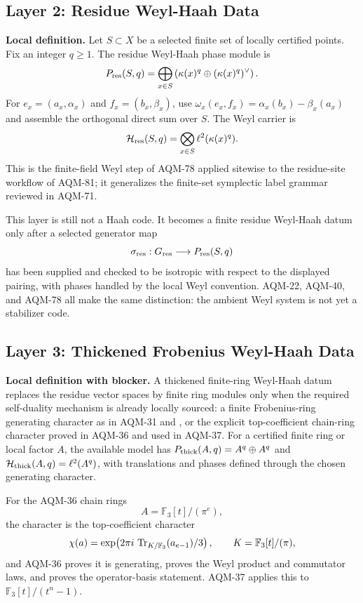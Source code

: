 \subsection{Layer 2: Residue Weyl-Haah Data}

\textbf{Local definition.}  Let \(S\subset X\) be a selected finite set of
locally certified points.  Fix an integer \(q\ge1\).  The residue
Weyl-Haah phase module is
\[
  P_{\rm res}(S,q)
  =
  \bigoplus_{x\in S}
  \left(\kappa(x)^q\oplus(\kappa(x)^q)^\vee\right).
\]
For \(e_x=(a_x,\alpha_x)\) and \(f_x=(b_x,\beta_x)\), use
\(\omega_x(e_x,f_x)=\alpha_x(b_x)-\beta_x(a_x)\) and assemble the orthogonal
direct sum over \(S\).  The Weyl carrier is
\[
  \mathcal H_{\rm res}(S,q)
  =\bigotimes_{x\in S}\ell^2(\kappa(x)^q).
\]
This is the finite-field Weyl step of AQM-78 applied sitewise to the
residue-site workflow of AQM-81; it generalizes the finite-set symplectic
label grammar reviewed in AQM-71.

This layer is still not a Haah code.  It becomes a finite residue
Weyl-Haah datum only after a selected generator map
\[
  \sigma_{\rm res}:G_{\rm res}\longrightarrow P_{\rm res}(S,q)
\]
has been supplied and checked to be isotropic with respect to the displayed
pairing, with phases handled by the local Weyl convention.  AQM-22, AQM-40,
and AQM-78 all make the same distinction: the ambient Weyl system is not yet
a stabilizer code.

\subsection{Layer 3: Thickened Frobenius Weyl-Haah Data}

\textbf{Local definition with blocker.}  A thickened finite-ring
Weyl-Haah datum replaces the residue vector spaces by finite ring modules
only when the required self-duality mechanism is already locally sourced:
a finite Frobenius-ring generating character as in AQM-31 and
, or the explicit
top-coefficient chain-ring character proved in AQM-36 and used in AQM-37.
For a certified finite ring or local factor \(A\), the available model has
\(P_{\rm thick}(A,q)=A^q\oplus A^q\) and
\(\mathcal H_{\rm thick}(A,q)=\ell^2(A^q)\), with translations and phases
defined through the chosen generating character.

For the AQM-36 chain rings
\[
  A=\mathbb F_3[t]/(\pi^e),
\]
the character is the top-coefficient character
\[
  \chi(a)=
  \exp\!\left(2\pi i\,\operatorname{Tr}_{K/\mathbb F_3}(a_{e-1})/3\right),
  \qquad K=\mathbb F_3[t]/(\pi),
\]
and AQM-36 proves it is generating, proves the Weyl product and commutator
laws, and proves the operator-basis statement.  AQM-37 applies this to
\(\mathbb F_3[t]/(t^n-1)\).

